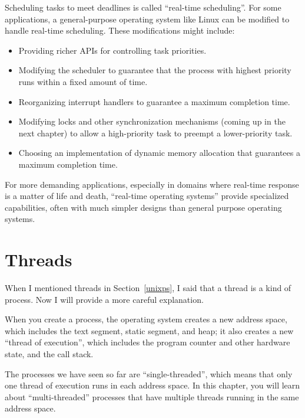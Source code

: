 \documentclass[12pt]{book}
\begin{document}
{Scheduling tasks to meet deadlines is called ``real-time
  scheduling''.  For some applications, a general-purpose operating
system like Linux can be modified to handle real-time scheduling.
These modifications might include:

\begin{itemize}

\item Providing richer APIs for controlling task priorities.

\item Modifying the scheduler to guarantee that the process with
highest priority runs within a fixed amount of time.

\item Reorganizing interrupt handlers to guarantee
a maximum completion time.

\item Modifying locks and other synchronization mechanisms (coming up
  in the next chapter) to allow a high-priority task to preempt a
  lower-priority task.

\item Choosing an implementation of dynamic memory allocation that
guarantees a maximum completion time.

\end{itemize}

For more demanding applications, especially in domains where real-time
response is a matter of life and death, ``real-time operating
  systems'' provide specialized capabilities, often with much simpler
designs than general purpose operating systems.



\chapter{Threads}

When I mentioned threads in Section~\ref{unixps}, I said that a thread
is a kind of process.  Now I will provide a more careful explanation.

When you create a process, the operating system creates a new address
space, which includes the text segment, static segment, and heap; it
also creates a new ``thread of execution'', which includes the program
counter and other hardware state, and the call stack.

The processes we have seen so far are ``single-threaded'', which means
that only one thread of execution runs in each address space.  In this
chapter, you will learn about ``multi-threaded'' processes that have
multiple threads running in the same address space.

}
\end{document}
